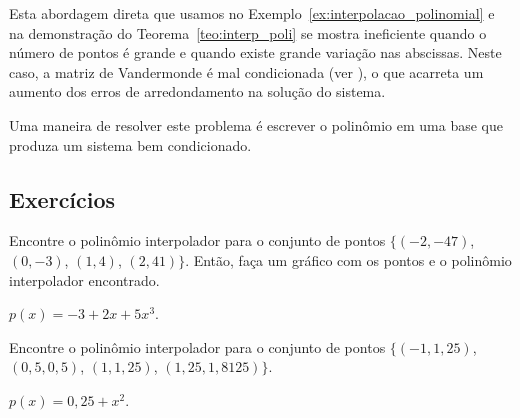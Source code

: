 
Esta abordagem direta que usamos no Exemplo~\ref{ex:interpolacao_polinomial} e na demonstração do Teorema~\ref{teo:interp_poli} se mostra ineficiente quando o número de pontos é grande e quando existe grande variação nas abscissas. Neste caso, a matriz de Vandermonde é mal condicionada (ver \cite{Gautschi}), o que acarreta um aumento dos erros de arredondamento na solução do sistema.

Uma maneira de resolver este problema é escrever o polinômio em uma base que produza um sistema bem condicionado.

\subsection*{Exercícios}

\begin{exer}\label{exer:interp1}
Encontre o polinômio interpolador para o conjunto de pontos $\{(-2, -47)$, $(0, -3)$, $(1, 4)$, $(2, 41)\}$. Então, faça um gráfico com os pontos e o polinômio interpolador encontrado.
\end{exer}
\begin{resp}
  
    $p(x) = -3 + 2x + 5x^3$.
  
\end{resp}

\begin{exer}
  Encontre o polinômio interpolador para o conjunto de pontos $\{(-1, 1,25)$, $(0,5, 0,5)$, $(1, 1,25)$, $(1,25, 1,8125)\}$.
\end{exer}
\begin{resp}
  
    $p(x) = 0,25 + x^2$.
  
\end{resp}

